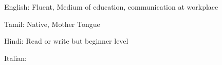 


\begin{cvskills}


\cvskill
{English:} %
{Fluent, Medium of education, communication at workplace} %


\cvskill
{Tamil:} %
{Native, Mother Tongue} %


\cvskill
{Hindi:} %
{Read or write but beginner level} %

\cvskill
{Italian:}


\end{cvskills}
